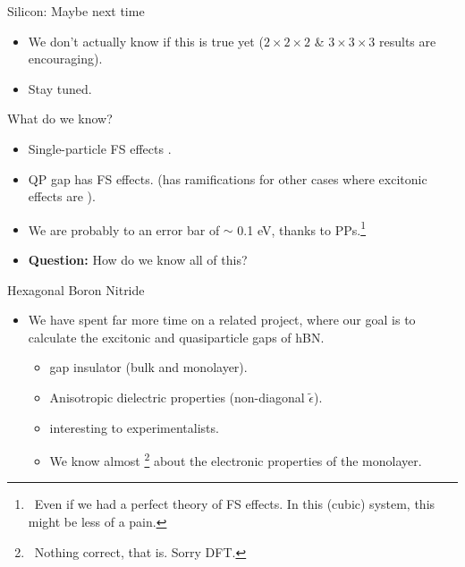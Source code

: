 \documentclass[12pt, pdf, hyperref={draft}, usenames, dvipsnames,
aspectratio=169]{beamer}
\newcommand{\red}[1]{{\bf\color{LancsRed}{#1}}}
\newcommand{\blue}[1]{{\bf\color{NavyBlue}{#1}}}
\newcommand{\green}[1]{{\bf\color{ForestGreen}{#1}}}
\begin{document}
\begin{frame}{Silicon: Maybe next time}
\begin{itemize}
  \item We don't actually know if this is true yet ($2\times2\times2$ \&
  $3\times3\times3$ results are encouraging).
  \item Stay tuned.
\end{itemize}

\begin{block}{What do we know?}
  \begin{itemize}
    \item Single-particle FS effects \green{don't play much of a role}.

    \item QP gap has \red{more severe} FS effects.
    (has ramifications for other cases where excitonic effects are
    \blue{weak}).

    \item We are probably \red{limited} to an error bar of $\sim$ 0.1 eV,
    thanks to PPs.\footnote{\ Even if we had a perfect theory of FS effects. In
    this (cubic) system, this might be less of a pain.}

    \item \textbf{Question:} How do we know all of this?
  \end{itemize}
\end{block}
\end{frame}


\begin{frame}{Hexagonal Boron Nitride}
\begin{itemize}
  \item We have spent far more time on a related project, where our goal is to
  calculate the excitonic and quasiparticle gaps of hBN.\@
  \begin{itemize}
    \item \blue{Large} gap insulator (bulk and monolayer).

    \item Anisotropic dielectric properties (non-diagonal $\tilde\epsilon$).

    \item \green{Extremely} interesting to experimentalists.

    \item We know almost \red{nothing}\footnote{\ Nothing correct, that is.
    Sorry DFT.} about the electronic properties of the monolayer.
  \end{itemize}
\end{itemize}
\end{frame}
\end{document}
